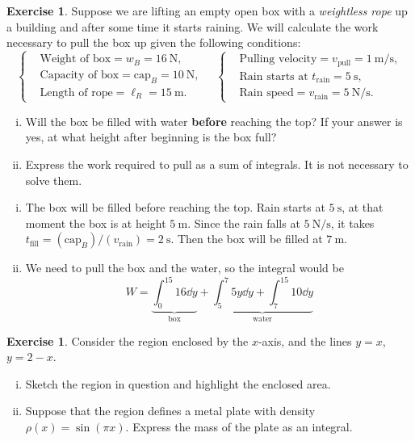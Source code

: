 \documentclass[12pt]{article}
\theoremstyle{plain}
\theoremstyle{definition}
\newtheorem{Ej}[Th]{Exercise}         %
\theoremstyle{remark}
\renewcommand{\l}{\ell}
\renewcommand{\:}{\colon}           %
\renewcommand{\.}{\Cdot}                %
\begin{document}

\begin{Ej}
  Suppose we are lifting an empty open box with a \emph{weightless rope} up a building and after some time it starts raining. We will calculate the work necessary to pull the box up given the following conditions:
  $$\left\lbrace
  \begin{aligned}
    &\text{Weight of box}=w_B=16\ \si\newton,\\
    &\text{Capacity of box}=\text{cap}_B=10\ \si\newton,\\
    &\text{Length of rope}=\l_R=15\ \si\metre.
  \end{aligned}
  \quad 
  \left\lbrace
\begin{aligned}
  &\text{Pulling velocity}=v_{\text{pull}}=1\ \si{\metre\per\second},\\
  &\text{Rain starts at }t_{\text{rain}}=5\ \si{\second},\\
  &\text{Rain speed}=v_{\text{rain}}=5\ \si{\newton\per\second}.
\end{aligned}
\right.\right.$$
  \begin{enumerate}[i)]
    \itemsep=-0.4em 
    \item Will the box be filled with water \textbf{before} reaching the top? If your answer is yes, at what height after beginning is the box full?
    \item Express the work required to pull as a sum of integrals. It is not necessary to solve them.
  \end{enumerate}
\end{Ej}
\begin{ptcb}
  \begin{enumerate}[i)]
    \itemsep=-0.4em 
    \item The box will be filled before reaching the top. Rain starts at $5\ \si\second$, at that moment the box is at height $5\ \si\metre$. Since the rain falls at $5\ \si{\newton\per\second}$, it takes $t_{\text{fill}}=(\text{cap}_B)/(v_{\text{rain}})=2\ \si\second$. Then the box will be filled at $7\ \si\metre$.
    \item We need to pull the box and the water, so the integral would be
    $$W=\underbrace{\int_0^{15} 16\dd y}_{\text{box}}+\underbrace{\int_5^{7}5y\dd y+\int_7^{15}10\dd y}_{\text{water}}
    $$
  \end{enumerate}
\end{ptcb}

\begin{Ej}
  Consider the region enclosed by the $x$-axis, and the lines $y=x$, $y=2-x$.
  \begin{enumerate}[i)]
    \itemsep=-0.4em
    \item Sketch the region in question and highlight the enclosed area.
    \item Suppose that the region defines a metal plate with density $\rho(x)=\sin(\pi x)$. Express the mass of the plate as an integral.
  \end{enumerate}
\end{Ej}
\end{document}
